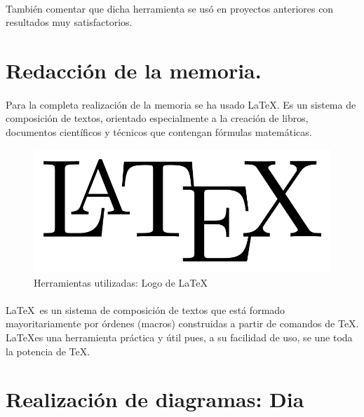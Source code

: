 \paragraph{}
También comentar que dicha herramienta se usó en proyectos anteriores con resultados muy satisfactorios.

\section{Redacción de la memoria.}

\paragraph{}
Para la completa realización de la memoria se ha usado \LaTeX. Es un sistema de composición de textos, orientado 
especialmente a la creación de libros, documentos científicos y técnicos que contengan fórmulas matemáticas.

\begin{figure}[H]
  \label{logo_latex}
  \begin{center}
    \includegraphics[scale=0.25]{imagenes/logo_latex.png}
  \end{center}
  \caption{Herramientas utilizadas: Logo de \LaTeX}
\end{figure}

\paragraph{}
\LaTeX~es un sistema de composición de textos que está formado mayoritariamente por órdenes (macros) construidas a partir de 
comandos de TeX. \LaTeX es una herramienta práctica y útil pues, a su facilidad de uso, se une toda la potencia de TeX.

\section{Realización de diagramas: Dia}

